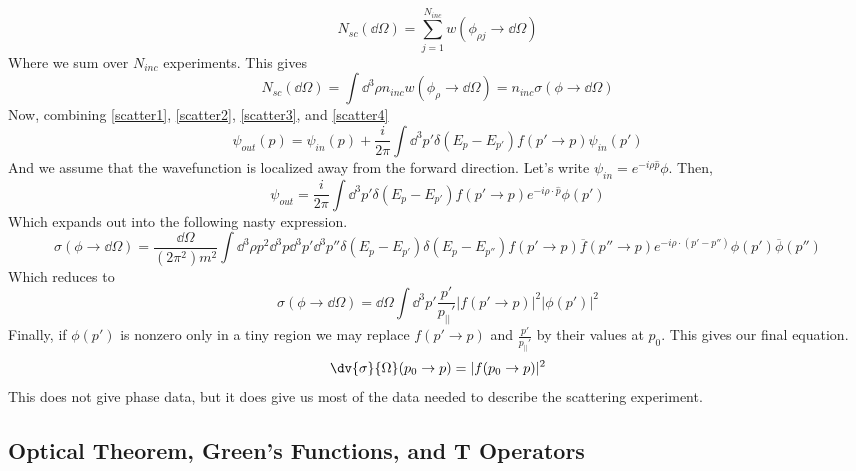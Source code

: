 \documentclass{article}
\begin{document}
\[N_{sc}(\dd \Omega) = \sum_{j=1}^{N_{inc}} w(\phi_{\rho j} \to \dd \Omega)\]
Where we sum over $N_{inc}$ experiments. This gives
\[N_{sc}(\dd \Omega) = \int \dd^3 \rho n_{inc} w(\phi_{\rho} \to \dd \Omega)= n_{inc} \sigma(\phi \to \dd\Omega)\]
Now, combining \eqref{scatter1}, \eqref{scatter2}, \eqref{scatter3}, and \eqref{scatter4}
\begin{equation}\psi_{out}(p) = \psi_{in}(p) + \frac{i}{2\pi} \int \dd^3 p' \delta(E_{p}-E_{p'})f(p' \to p) \psi_{in}(p')\end{equation}
And we assume that the wavefunction is localized away from the forward direction. Let's write $\psi_{in} = e^{-i\rho \hat p} \phi$. Then,
\[\psi_{out} = \frac{i}{2\pi} \int \dd^3 p' \delta(E_p-E_{p'})f(p' \to p) e^{-i\rho \cdot \hat p} \phi(p')\]
Which expands out into the following nasty expression.
\[\sigma(\phi \to \dd \Omega) = \frac{\dd \Omega}{(2\pi^2)m^2}\int \dd^3 \rho p^2 \dd^3 p  \dd^3 p' \dd^3 p'' \delta(E_p-E_{p'})\delta(E_p-E_{p''})f(p' \to p) \overline{f}(p''\to p) e^{-i \rho \cdot (p'-p'')} \phi(p')\overline{\phi}(p'')\]
Which reduces to
\begin{equation}\sigma(\phi \to \dd\Omega) = \dd \Omega \int \dd^3 p' \frac{p'}{p_{||}'}|f(p'\to p)|^2 |\phi(p')|^2\end{equation}
Finally, if $\phi(p')$ is nonzero only in a tiny region we may replace $f(p'\to p)$ and $\frac{p'}{p_{||}'}$ by their values at $p_0$. This gives our final equation.
\begin{equation}\dv{\sigma}{\Omega}(p_0\to p) = |f(p_0\to p)|^2\end{equation}
This does not give phase data, but it does give us most of the data needed to describe the scattering experiment.
\subsection{Optical Theorem, Green's Functions, and T Operators}
\end{document}
